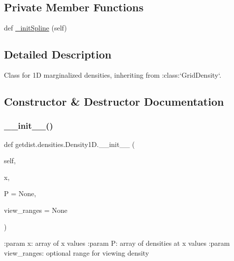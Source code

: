 \subsection*{Private Member Functions}
\begin{DoxyCompactItemize}
\item 
def \mbox{\hyperlink{classgetdist_1_1densities_1_1Density1D_ac4f1619c135056810bde1b5766d1b549}{\+\_\+init\+Spline}} (self)
\end{DoxyCompactItemize}


\subsection{Detailed Description}
\begin{DoxyVerb}Class for 1D marginalized densities, inheriting from :class:`GridDensity`.\end{DoxyVerb}
 

\subsection{Constructor \& Destructor Documentation}
\mbox{\label{classgetdist_1_1densities_1_1Density1D_a1951d276ea29a82aeaac411fdbcffb3a}} 
\subsubsection{\texorpdfstring{\+\_\+\+\_\+init\+\_\+\+\_\+()}{\_\_init\_\_()}}
{\footnotesize\ttfamily def getdist.\+densities.\+Density1\+D.\+\_\+\+\_\+init\+\_\+\+\_\+ (\begin{DoxyParamCaption}\item[{}]{self,  }\item[{}]{x,  }\item[{}]{P = {\ttfamily None},  }\item[{}]{view\+\_\+ranges = {\ttfamily None} }\end{DoxyParamCaption})}

\begin{DoxyVerb}:param x: array of x values
:param P: array of densities at x values
:param view_ranges: optional range for viewing density
\end{DoxyVerb}
 

